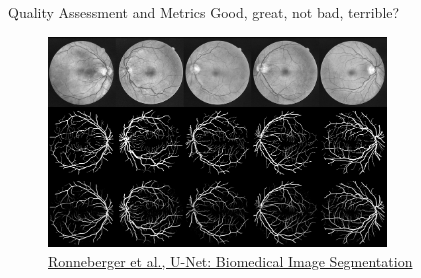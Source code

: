 \documentclass[handout]{beamer}
\begin{document}
\begin{frame}{Quality Assessment and Metrics}
Good, great, not bad, terrible?
\begin{figure}
\centering
\includegraphics[width=0.8\textwidth]{../media/unet_retina_segmentation.png}
\caption{\href{https://arxiv.org/abs/1505.04597}{\color{blue}Ronneberger et al., U-Net: Biomedical Image Segmentation}}\end{figure}
\end{frame}
\end{document}

